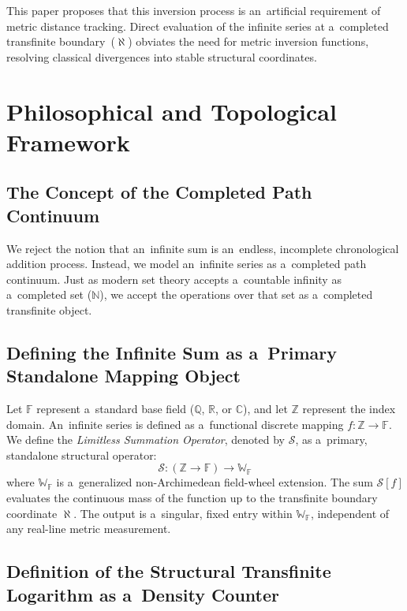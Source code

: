 \documentclass[11pt,a4paper]{article}
\theoremstyle{definition}
\theoremstyle{noperiod}
\begin{document}
This paper proposes that this inversion process is an~artificial requirement of metric distance tracking.
Direct evaluation of the infinite series at a~completed transfinite boundary~($\aleph$) obviates the need for metric inversion functions, resolving classical divergences into stable structural coordinates.

\section{Philosophical and Topological Framework}

\subsection{The Concept of the Completed Path Continuum}

We reject the notion that an~infinite sum is an~endless, incomplete chronological addition process. Instead, we model an~infinite series as a~completed path continuum. Just as modern set theory accepts a~countable infinity as a~completed set ($\mathbb{N}$), we accept the operations over that set as a~completed transfinite object.

\subsection{Defining the Infinite Sum as a~Primary Standalone Mapping Object}

Let $\mathbb{F}$ represent a~standard base field ($\mathbb{Q}$, $\mathbb{R}$, or $\mathbb{C}$), and let $\mathbb{Z}$ represent the index domain. An~infinite series is defined as a~functional discrete mapping $f: \mathbb{Z} \to \mathbb{F}$. We define the \textit{Limitless Summation Operator}, denoted by $\mathcal{S}$, as a~primary, standalone structural operator:
\begin{equation}
\mathcal{S}: (\mathbb{Z} \to \mathbb{F}) \longrightarrow \mathbb{W}_{\mathbb{F}}
\end{equation}
where $\mathbb{W}_{\mathbb{F}}$ is a~generalized non-Archimedean field-wheel extension. The sum $\mathcal{S}[f]$ evaluates the continuous mass of the function up to the transfinite boundary coordinate $\aleph$. The output is a~singular, fixed entry within $\mathbb{W}_{\mathbb{F}}$, independent of any real-line metric measurement.

\subsection{Definition of the Structural Transfinite Logarithm as a~Density Counter}
\end{document}
